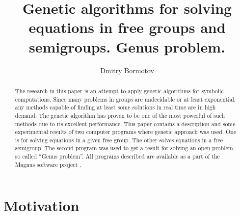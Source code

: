 \documentclass{article}
\title{Genetic algorithms for solving
equations in free groups and semigroups.  Genus problem.}
\author{Dmitry Bormotov} \date{}
\begin{document}
\maketitle

\begin{abstract}
The research in this paper is an attempt to apply genetic algorithms
for symbolic computations. Since many problems in groups are
undecidable or at least exponential, any methods capable of finding at
least some solutions in real time are in high demand. The genetic
algorithm has proven to be one of the most powerful of such methods
due to its excellent performance. This paper contains a description
and some experimental results of two computer programs where genetic
approach was used. One is for solving equations in a given free
group. The other solves equations in a free semigroup. The second
program was used to get a result for solving an open problem, so
called ``Genus problem''. All programs described are available as a
part of the Magnus software project \cite{Magnus}.
\end{abstract}

\section{Motivation}
\end{document}
